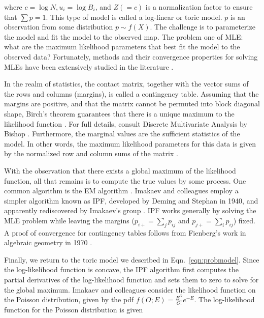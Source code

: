where $c = \log{N}, u_i = \log{B_i}$, and $Z (= c)$ is a normalization factor to ensure that $\sum p = 1$.  This type of
model is called a \gls{log-linear} or \gls{toric model}.  $p$ is an observation from some distribution $p \sim f(X)$.  The challenge is to
parameterize the model and fit the model to the observed map.  The problem one of \gls{MLE}: what are the maximum likelihood parameters
that best fit the model to the observed data?  Fortunately, methods and their convergence properties for solving \glspl{MLE} have been extensively
studied in the literature \citep{pachter2005,fienberg2012}.

In the realm of statistics, the contact matrix, together with the vector sums of the rows and columns (margins), is called a \gls{contingency table}.  Assuming
that the margins are positive, and that the matrix cannot be permuted into block diagonal shape, Birch's theorem guarantees that there is a
unique maximum to the likelihood function \citep{bishop1975, pachter2005}.  For full details, consult Discrete Multivariate Analysis by
Bishop \citep{bishop1975}.  Furthermore, the marginal values are the \glspl{sufficient statistic} of the model.  In other words, the maximum
likelihood parameters for this data is given by the normalized row and column sums of the matrix \citep{pachter2005}.

With the observation that there exists a global maximum of the likelihood function, all that remains is to compute the true values by some
process.  One common algorithm is the \gls{EM} algorithm \citep{fuchs1982}.  Imakaev and colleagues employ a simpler algorithm known as \gls{IPF},
developed by Deming and Stephan in 1940, and apparently rediscovered by Imakaev's group \citep{deming1940}.  \gls{IPF} works generally by solving
the \gls{MLE} problem while leaving the margins ($p_{i+} = \sum_{j}p_{ij}$ and $p_{j+} = \sum_{i}p_{ij}$) fixed.  A proof of convergence for contingency
tables follows from Fienberg's work in algebraic geometry in 1970 \citep{fienberg1970}.

Finally, we return to the \gls{toric model} we described in Eqn.~\eqref{eqn:probmodel}.  Since the log-likelihood function is concave, the \gls{IPF}
algorithm first computes the partial derivatives of the log-likelihood function and sets them to zero to solve for the global maximum.  Imakaev
and colleagues consider the likelihood function on the Poisson distribution, given by the \gls{pdf} $f(O;E) = \frac{E^{O}}{O!}e^{-E}$.  The
log-likelihood function for the Poisson distribution is given

